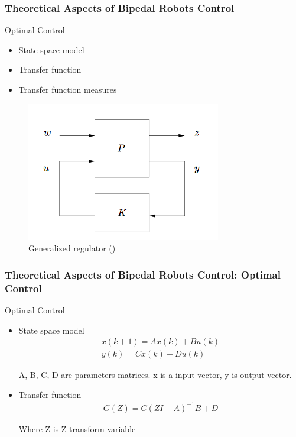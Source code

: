\documentclass{beamer}
\begin{document}
	\begin{frame}
		\frametitle{Theoretical Aspects of Bipedal Robots Control}
		\begin{block}{Optimal Control}
			\begin{itemize}
				\item
					State space model
				\item
					Transfer function
				\item
					Transfer function measures
			\end{itemize}
		\end{block}
		
		\begin{figure}[h!]
			\includegraphics[width=0.5\linewidth]{presentation_images/15}
			\caption{Generalized regulator (\cite{hazell2008discrete})}
		\end{figure}
	\end{frame}


	\begin{frame}
		\frametitle{Theoretical Aspects of Bipedal Robots Control: Optimal Control}
		\begin{block}{Optimal Control}
			\begin{itemize}
				\item
					State space model
					\begin{equation}
						\begin{split}
							x(k+1) = Ax(k) + Bu(k)\\
							y(k) = Cx(k) + Du(k)
						\end{split}
					\end{equation}
					
					A, B, C, D are parameters matrices.
					x is a input vector, y is output vector.
				\item
					Transfer function
					\begin{equation}
						\begin{split}
							G(Z) = C(ZI - A)^{-1} B + D
						\end{split}
					\end{equation}
					
					Where Z is Z transform variable
			\end{itemize}
		\end{block}
	\end{frame}
	
\end{document}

